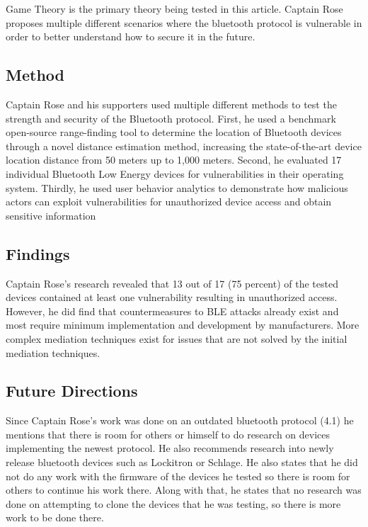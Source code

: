 \documentclass[letterpaper,12pt]{article}
\begin{document}
\noindent
Game Theory is the primary theory being tested in this article.  Captain Rose proposes multiple different scenarios where the bluetooth protocol is vulnerable in order to better understand how to secure it in the future.

\subsection{Method}

\noindent
Captain Rose and his supporters used multiple different methods to test the strength and security of the Bluetooth protocol. First, he used a benchmark open-source range-finding tool to determine the location of Bluetooth devices through a novel distance estimation method, increasing the state-of-the-art device location distance from 50 meters up to 1,000 meters. Second, he evaluated 17 individual Bluetooth Low Energy devices for vulnerabilities in their operating system. Thirdly, he used user behavior analytics to demonstrate how malicious actors can exploit vulnerabilities for unauthorized device access and obtain sensitive information

\subsection{Findings}

\noindent
Captain Rose's research revealed that 13 out of 17 (75 percent) of the tested devices contained at least one vulnerability resulting in unauthorized access. However, he did find that countermeasures to BLE attacks already exist and most require minimum implementation and development by manufacturers. More complex mediation techniques exist for issues that are not solved by the initial mediation techniques.

\subsection{Future Directions}

\noindent
Since Captain Rose's work was done on an outdated bluetooth protocol (4.1) he mentions that there is room for others or himself to do research on devices implementing the newest protocol. He also recommends research into newly release bluetooth devices such as Lockitron or Schlage. He also states that he did not do any work with the firmware of the devices he tested so there is room for others to continue his work there. Along with that, he states that no research was done on attempting to clone the devices that he was testing, so there is more work to be done there.
\end{document}
